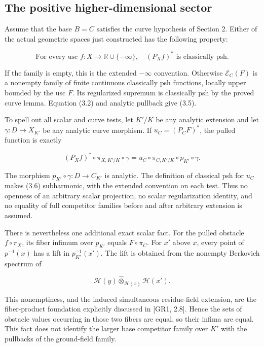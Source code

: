 \documentclass[11pt,a4paper]{article}
\begin{document}
\subsection*{The positive higher-dimensional sector}

Assume that the base \(B=C\) satisfies the curve hypothesis of Section 2. Either of the actual geometric spaces just constructed has the following property:

\[
\boxed{\text{For every usc }f:X\to\mathbb R\cup\{-\infty\},
\quad (P_Xf)^*\text{ is classically psh.}} \tag{3.5}
\]

If the family is empty, this is the extended \(-\infty\) convention. Otherwise \(\mathcal E_C(F)\) is a nonempty family of finite continuous classically psh functions, locally upper bounded by the usc \(F\). Its regularized supremum is classically psh by the proved curve lemma. Equation (3.2) and analytic pullback give (3.5).

To spell out all scalar and curve tests, let \(K'/K\) be any analytic extension and let \(\gamma:D\to X_{K'}\) be any analytic curve morphism. If \(u_C=(P_CF)^*\), the pulled function is exactly

\[
(P_Xf)^*\circ\pi_{X,K'/K}\circ\gamma
=u_C\circ\pi_{C,K'/K}\circ p_{K'}\circ\gamma. \tag{3.6}
\]

The morphism \(p_{K'}\circ\gamma:D\to C_{K'}\) is analytic. The definition of classical psh for \(u_C\) makes (3.6) subharmonic, with the extended convention on each test. Thus no openness of an arbitrary scalar projection, no scalar regularization identity, and no equality of full competitor families before and after arbitrary extension is assumed.

There is nevertheless one additional exact scalar fact. For the pulled obstacle \(f\circ\pi_X\), its fiber infimum over \(p_{K'}\) equals \(F\circ\pi_C\). For \(x'\) above \(x\), every point of \(p^{-1}(x)\) has a lift in \(p_{K'}^{-1}(x')\). The lift is obtained from the nonempty Berkovich spectrum of

\[
\mathcal H(y)\widehat\otimes_{\mathcal H(x)}\mathcal H(x').
\]

This nonemptiness, and the induced simultaneous residue-field extension, are the fiber-product foundation explicitly discussed in [GR1, 2.8]. Hence the sets of obstacle values occurring in those two fibers are equal, so their infima are equal. This fact does not identify the larger base competitor family over \(K'\) with the pullbacks of the ground-field family.
\end{document}

